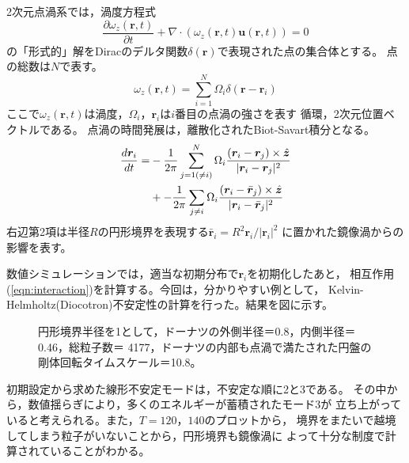 \documentclass{jspf}            %
\newcommand{\wz}{\omega_z}
\newcommand{\vu}{\vec{u}}
\newcommand{\vr}{\vec{r}}
\renewcommand{\div}{\nabla \cdot}
\renewcommand{\vec}[1]{\bm{#1}}
\begin{document}
2次元点渦系では，渦度方程式
\begin{equation}
	\frac{\partial \wz(\vr,t)}{\partial t} + \div(\wz(\vr,t) \vu(\vr,t)) =0
\end{equation}
の「形式的」解をDiracのデルタ関数$\delta(\vr)$で表現された点の集合体とする。
点の総数は$N$で表す。
\begin{equation}
	\wz(\vr,t) = \sum_{i=1}^N\Omega_i \delta(\vr - \vr_i)
\end{equation}
ここで$\wz(\vr,t)$は渦度，$\Omega_i$，$\vr_i$は$i$番目の点渦の強さを表す
循環，2次元位置ベクトルである。
点渦の時間発展は，離散化されたBiot-Savart積分となる。
\begin{align}
	\frac{d\vr_i}{dt} = & -\frac{1}{2\pi}\sum_{j=1(\neq i)}^N\Omega_i \frac{(\vr_i - \vr_j)\times\hat{\vec{z}}}{|\vr_i - \vr_j|^2}\notag\\
	& + -\frac{1}{2\pi}\sum_{j\neq i}\Omega_i \frac{(\vr_i - \bar{\vr}_j)\times\hat{\vec{z}}}{|\vr_i - \bar{\vr}_j|^2}\label{eqn:interaction}
\end{align}
右辺第2項は半径$R$の円形境界を表現する$\bar{\vr}_i = R^2\vr_i/|\vr_i|^2$
に置かれた鏡像渦からの影響を表す。

数値シミュレーションでは，適当な初期分布で$\vr_i$を初期化したあと，
相互作用(\ref{eqn:interaction})を計算する。今回は，分かりやすい例として，
Kelvin-Helmholtz(Diocotron)不安定性の計算を行った。結果を図に示す。
\begin{figure}[h]
\begin{center}
\caption{円形境界半径を1として，ドーナツの外側半径＝0.8，内側半径＝0.46，総粒子数＝
4177，ドーナツの内部も点渦で満たされた円盤の剛体回転タイムスケール＝10.8。}
\label{fig0}
\end{center}
\end{figure}
初期設定から求めた線形不安定モードは，不安定な順に2と3である\cite{Davidson2001}。
その中から，数値揺らぎにより，多くのエネルギーが蓄積されたモード3が
立ち上がっていると考えられる。また，$T=120，140$のプロットから，
境界をまたいで越境してしまう粒子がいないことから，円形境界も鏡像渦に
よって十分な制度で計算されていることがわかる。
\end{document}
